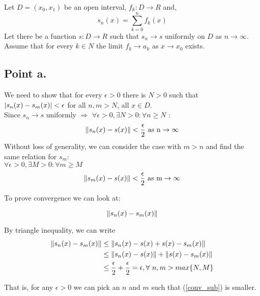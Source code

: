 \begin{homeworkProblem}
Let $D = (x_{0}, x_{1})$ be an open interval, $f_{k}:D \rightarrow R$ and,
\begin{equation}
    s_{n}(x)=\sum_{k=0}^{n}f_{k}(x)
\end{equation}
Let there be a function $s:D \rightarrow R$ such that $s_{n} \rightarrow s$ uniformly on $D$ as $n \rightarrow \infty$.
Assume that for every $k \in N$ the limit $f_{k} \xrightarrow{} a_{k}$ as $x \xrightarrow{} x_{0}$ exists.\\

\subsection{Point a.}
We need to show that for every $\epsilon > 0$ there is $N > 0$ such that $\left\lvert s_{n}(x)-s_{m}(x)\right\rvert < \epsilon$ for all $n, m > N$, all $x \in D$.\\
Since $s_{n} \rightarrow s$ uniformly $\Rightarrow$ $\forall \epsilon > 0, \exists N > 0 : \forall n \geq N$ :
\begin{equation}
    \left\lVert s_{n}(x)-s(x)\right\rVert < \frac{\epsilon}{2} \ \text{as n} \rightarrow \infty
\end{equation}
Without loss of generality, we can consider the case with $m>n$ and find the same relation for $s_{m}$:\\ $\forall \epsilon > 0, \exists M > 0 : \forall m \geq M$
\begin{equation}
    \left\lVert s_{m}(x)-s(x)\right\rVert < \frac{\epsilon}{2} \ \text{as m}  \rightarrow \infty
\end{equation}

To prove convergence we can look at:

\begin{equation} \label{conv_sub}
    \left\lVert s_{n}(x)-s_{m}(x)\right\rVert
\end{equation}

By triangle inequality, we can write
\begin{equation}
    \begin{split}
    \left\lVert s_{n}(x)-s_{m}(x)\right\rVert & \leq \left\lVert s_{n}(x)-s(x)+s(x)-s_{m}(x)\right\rVert\\
    & \leq \left\lVert s_{n}(x)-s(x)\right\rVert+\left\lVert s(x)-s_{m}(x)\right\rVert\\
    & \leq \frac{\epsilon}{2} + \frac{\epsilon}{2} = \epsilon, \forall \ n,m > max \{N, M\}
    \end{split}
\end{equation}

That is, for any $\epsilon > 0$ we can pick an $n$ and $m$ such that (\ref{conv_sub}) is smaller.
    

\end{homeworkProblem}
